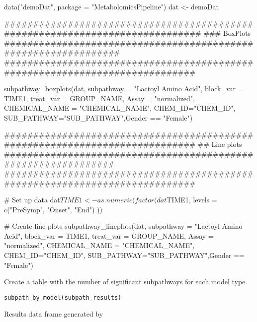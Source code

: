 \documentclass[a4paper]{book}
\begin{document}
\begin{Examples}
\begin{ExampleCode}
data("demoDat", package = "MetabolomicsPipeline")
dat <- demoDat

#############################################################################
### BoxPlots ###############################################################
############################################################################

subpathway_boxplots(dat,
                 subpathway = "Lactoyl Amino Acid", block_var = TIME1,
                 treat_var = GROUP_NAME, Assay = "normalized",
                 CHEMICAL_NAME = "CHEMICAL_NAME",
                 CHEM_ID="CHEM_ID",
                 SUB_PATHWAY="SUB_PATHWAY",Gender == "Female")


############################################################################
## Line plots ##############################################################
############################################################################

# Set up data
dat$TIME1 <- as.numeric(factor(dat$TIME1,
    levels = c("PreSymp", "Onset", "End")
))

# Create line plots
subpathway_lineplots(dat,
                    subpathway = "Lactoyl Amino Acid",
                    block_var = TIME1, treat_var = GROUP_NAME,
                    Assay = "normalized",
                    CHEMICAL_NAME = "CHEMICAL_NAME",
                    CHEM_ID="CHEM_ID",
                    SUB_PATHWAY="SUB_PATHWAY",Gender == "Female")




\end{ExampleCode}
\end{Examples}
%
\begin{Description}
Create a table with the number of significant subpathways for each model
type.
\end{Description}
%
\begin{Usage}
\begin{verbatim}
subpath_by_model(subpath_results)
\end{verbatim}
\end{Usage}
%
\begin{Arguments}
\begin{ldescription}
\item[\code{subpath\_results}] Results data frame generated by
\end{ldescription}
\end{Arguments}
\end{document}
